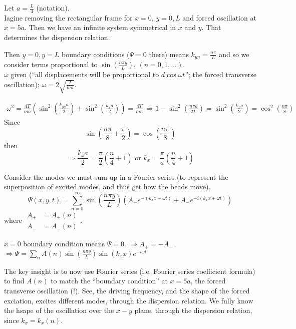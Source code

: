\documentclass[twoside,10pt]{amsart}
\newcommand{\problemhead}[1]
  {\smallskip
   \noindent{\large\bf Problem #1.}
   \smallskip}
\begin{document}
\problemhead{11.2} Let $a = \frac{L}{4}$ (notation).  \\
Iagine removing the rectangular frame for $x=0$, $y=0,L$ and forced oscillation at $x=5a$.  Then we have an infinite system symmetrical in $x$ and $y$.  That determines the dispersion relation.  

Then $y=0,y=L$ boundary conditions ($\Psi =0$ there) means $k_{yn} = \frac{n\pi}{L}$ and so we consider terms proportional to $\sin{ \left( \frac{n\pi y}{L} \right)}$, $(n=0,1,\dots)$.  \\
$\omega$ given (``all displacements will be proportional to $d\cos{\omega t}$''; the forced transverse oscillation); $\omega = 2 \sqrt{ \frac{T}{ma} }$.  

\[
\begin{gathered}
  \omega^2 = \frac{4 T}{ ma} ( \sin^2{ \left( \frac{k_{yn}a}{2} \right) } + \sin^2{ \left( \frac{ k_x a}{2} \right) } ) = \frac{4T}{ma} \, \Longrightarrow 1 - \sin^2{ \left( \frac{ n \pi a}{2L} \right) } = \sin^2{ \left( \frac{ k_x a}{2} \right) } = \cos^2{ \left( \frac{ n \pi }{8} \right) }
\end{gathered}
\]
Since
\[
\sin{ \left( \frac{ n\pi}{8} + \frac{\pi}{2} \right) } = \cos{ \left( \frac{n \pi}{8} \right) } 
\]
then
\[
\Longrightarrow \frac{k_x a}{2} = \frac{ \pi}{2} \left( \frac{n}{4} + 1 \right) \text{ or } k_x = \frac{\pi}{a}  \left( \frac{n}{4} +1 \right) 
\]

Consider the modes we must sum up in a Fourier series (to represent the superposition of excited modes, and thus get how the beads move).  
\[
\Psi(x,y,t) = \sum_{n=0}^{\infty} \sin{  \left( \frac{ n \pi y}{L} \right) } ( A_+ e^{- (k_x x - \omega t) } + A_- e^{-i (k_x x + \omega t)} )
\]
where $\begin{aligned} A_+ & = A_+(n) \\ A_- & = A_-(n) \end{aligned}$. 

$x=0$ boundary condition means $\Psi =0$.  $\Longrightarrow A_+ = -A_-$.  \\
$\Longrightarrow \Psi = \sum_n A(n) \sin{ \left( \frac{ n \pi y}{ L} \right) } \sin{( k_x x) }e^{- i \omega t}$  

The key insight is to now use Fourier series (i.e. Fourier series coefficient formula) to find $A(n)$ to match the ``boundary condition'' at $x=5a$, the forced transverse oscillation (!).  See, the driving frequency, and the shape of the forced exciation, excites different modes, through the dispersion relation.  We fully know the hsape of the oscillation over the $x-y$ plane, through the dispersion relation, since $k_x = k_x(n)$.  
\end{document}
